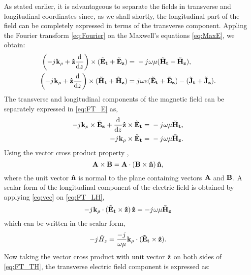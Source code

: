\documentclass[11pt]{article}
\begin{document}
As stated earlier, it is advantageous to separate the fields in transverse and longitudinal coordinates since, as we shall shortly, the longitudinal part of the field can be completely expressed in terms of the transverse component. Appling the Fourier transform \eqref{eq:Fourier} on the Maxwell's equations \eqref{eq:MaxE}, we obtain:
%
\begin{subequations}
  \begin{align}
    \left(-j\mkern1mu \mathbf{k_{\rho}} + \mathbf{\hat{z}} \dv{}{z} \right)\times (\mathbf{\tilde{E}_t} + \mathbf{\tilde{E}_z})  ={}& -j\mkern1mu \omega \mu (\mathbf{\tilde{H}_t} + \mathbf{\tilde{H}_z}),
    \label{eq:FT_E}\\
    \left(-j\mkern1mu \mathbf{k_{\rho}} + \mathbf{\hat{z}} \dv{}{z} \right)\times (\mathbf{\tilde{H}_t} + \mathbf{\tilde{H}_z})  ={}& j\mkern1mu \omega \varepsilon (\mathbf{\tilde{E}_t} + \mathbf{\tilde{E}_z}) -
    (\mathbf{\tilde{J}_t} + \mathbf{\tilde{J}_z}).
    \label{eq:FT_H}
  \end{align}
  \label{eq:FT_EH}%
\end{subequations}
%
The transverse and longitudinal components of the magnetic field can be separately expressed in \eqref{eq:FT_E} as,
%
\begin{subequations}
  \begin{align}
    -j\mkern1mu \mathbf{k_{\rho}} \times \mathbf{\tilde{E}_z} +
    \dv{}{z}\mathbf{\hat{z}} \times \mathbf{\tilde{E}_t} ={}&
    -j\mkern1mu \omega \mu \mathbf{\tilde{H}_t},
    \label{eq:FT_TH}\\
    -j\mkern1mu \mathbf{k_{\rho}} \times \mathbf{\tilde{E}_t} ={}&
    -j\mkern1mu \omega \mu \mathbf{\tilde{H}_z}.
    \label{eq:FT_LH}
  \end{align}
  \label{eq:FT_TLH}%
\end{subequations}
%
Using the vector cross product property \cite[p. 117]{fang2010},
%
\begin{equation}
  \mathbf{A} \times \mathbf{B} =\mathbf{A} \cdot (\mathbf{B} \times \mathbf{\hat{n}}) \, \mathbf{\hat{n}},
  \label{eq:vec}
\end{equation}
%
where the unit vector $\mathbf{\hat{n}}$ is normal to the plane containing vectors $\mathbf{A}$ and $\mathbf{B}$. A scalar form of the longitudinal component of the electric field is obtained by applying \eqref{eq:vec} on \eqref{eq:FT_LH},
%
\begin{equation}
   - j\mkern1mu \mathbf{k_{\rho}} \cdot (\mathbf{\tilde{E}_t} \times \mathbf{\hat{z}}) \, \mathbf{\hat{z}} =
   - j\mkern1mu \omega \mu \mathbf{\tilde{H}_z}
  \label{eq:FT_sLE}
\end{equation}
%
which can be written in the scalar form,
%
\begin{equation}
   - j\mkern1mu \tilde{H}_z = \frac{- j\mkern1mu}{\omega \mu}
   \mathbf{k_{\rho}} \cdot (\mathbf{\tilde{E}_t} \times \mathbf{\hat{z}}).
  \label{eq:sLH}
\end{equation}
%
Now taking the vector cross product with unit vector $\mathbf{\hat{z}}$ on both sides of \eqref{eq:FT_TH}, the transverse electric field component is expressed as:
\end{document}

